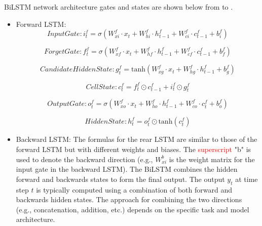 \documentclass[a4paper, fleqn]{cas-sc}
\theoremstyle{definition}
\theoremstyle{remark}
\begin{document}
BiLSTM network architecture gates and states are shown below from  to .
\begin{itemize}
  \item  Forward LSTM: \\

    \begin{equation} \label{bi i}
      Input Gate :  i_t^f = \sigma(W_{xi}^f \cdot x_t + W_{hi}^f \cdot h_{t-1}^f + W_{ci}^f \cdot c_{t-1}^f + b_i^f)
    \end{equation}

    \begin{equation}
      Forget Gate :  f_t^f = \sigma(W_{xf}^f \cdot x_t + W_{hf}^f \cdot h_{t-1}^f + W_{cf}^f \cdot c_{t-1}^f + b_f^f) 
    \end{equation}

    \begin{equation}
      Candidate Hidden State :   g_t^f = \text{tanh}(W_{xg}^f \cdot x_t + W_{hg}^f \cdot h_{t-1}^f + b_g^f)
    \end{equation}

    \begin{equation}
      Cell State :  c_t^f = f_t^f \odot c_{t-1}^f + i_t^f \odot g_t^f
    \end{equation}

    \begin{equation}
      Output Gate :  o_t^f = \sigma(W_{xo}^f \cdot x_t + W_{ho}^f \cdot h_{t-1}^f + W_{co}^f \cdot c_t^f + b_o^f)
    \end{equation}

    \begin{equation} \label{bi h}
      Hidden State :   h_t^f = o_t^f \odot \text{tanh}(c_t^f) 
    \end{equation}

  \item Backward LSTM: 
  The formulas for the rear LSTM are similar to those of the forward LSTM but with different weights and biases. The \textcolor{red}{superscript} "b" is used to denote the backward direction (e.g.,  \(W_{xi}^b\) is the weight matrix for the input gate in the backward LSTM). The BiLSTM combines the hidden forward and backwards states to form the final output. The output \(y_t\) at time step \(t\) is typically computed using a combination of both forward and backwards hidden states. The approach for combining the two directions (e.g.,  concatenation,  addition,  etc.) depends on the specific task and model architecture.
\end{itemize}
\end{document}
